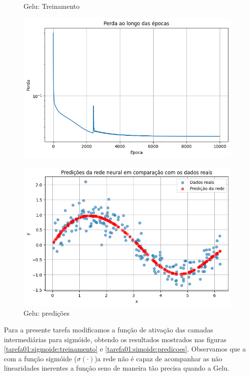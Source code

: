 \begin{figure}[htb]
	\centering
	\begin{minipage}{0.45\textwidth}
	\centering
	\caption{Gelu: Treinamento} \label{tarefa01:gelu:treinamento}
	\includegraphics[width=\textwidth]{./0803_imgs/png-241111-212601400-7995113924505873963.png}
	\end{minipage}
	\hfill
	\begin{minipage}{0.45\textwidth}
	\centering
	\caption{Gelu: predições} \label{tarefa01:gelu:predicoes}
	\includegraphics[width=\textwidth]{./0803_imgs/png-241111-212606975-12044568718402292765.png}
	\end{minipage}
\end{figure}

Para a presente tarefa modificamos a função de ativação das camadas intermediárias para sigmóide, obtendo os resultados mostrados nas figuras \ref{tarefa01:sigmoide:treinamento} e \ref{tarefa01:simoide:predicoes}. Observamos que a com a função sigmóide ($\sigma(\cdot)$)a rede não é capaz de acompanhar as não linearidades inerentes a função seno de maneira tão precisa quando a Gelu.


